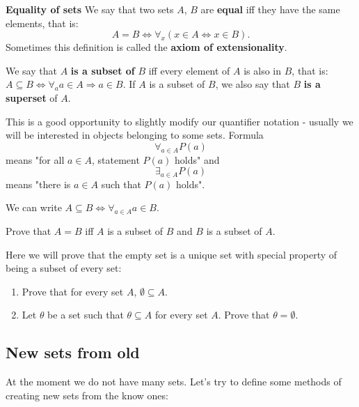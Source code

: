 \begin{definition}
  \textbf{Equality of sets} We say that two sets $A$, $B$ are \textbf{equal} iff they have the same elements, that is:
  $$A=B\Leftrightarrow \forall_x (x\in A \Leftrightarrow x\in B).$$
  Sometimes this definition is called the \textbf{axiom of extensionality}.
\end{definition}

\begin{definition}
  We say that $A$ \textbf{is a subset of} $B$ iff every element of $A$ is also in $B$, that is:
  $A\subseteq B \Leftrightarrow \forall_a a\in A\Rightarrow a\in B$.
  If $A$ is a subset of $B$, we also say that $B$ \textbf{is a superset} of $A$.
\end{definition}

This is a good opportunity to slightly modify our quantifier notation - usually we will be interested in objects belonging to some sets.
Formula $$\forall_{a\in A} P(a)$$ means "for all $a\in A$, statement $P(a)$ holds"
and $$\exists_{a\in A} P(a)$$ means "there is $a\in A$ such that $P(a)$ holds".

\begin{example}
  We can write $A\subseteq B \Leftrightarrow \forall_{a\in A} a\in B$.
\end{example}

\begin{exercise}
  Prove that $A=B$ iff $A$ is a subset of $B$ and $B$ is a subset of $A$.
\end{exercise}

\begin{exercise}
  Here we will prove that the empty set is a unique set with special property of being a subset of every set:
  \begin{enumerate}
    \item Prove that for every set $A$, $\emptyset\subseteq A$.
    \item Let $\theta$ be a set such that $\theta \subseteq A$ for every set $A$. Prove that $\theta=\emptyset$.
  \end{enumerate}
\end{exercise}

\subsection{New sets from old}
At the moment we do not have many sets. Let's try to define some methods of creating new sets from the know ones:

